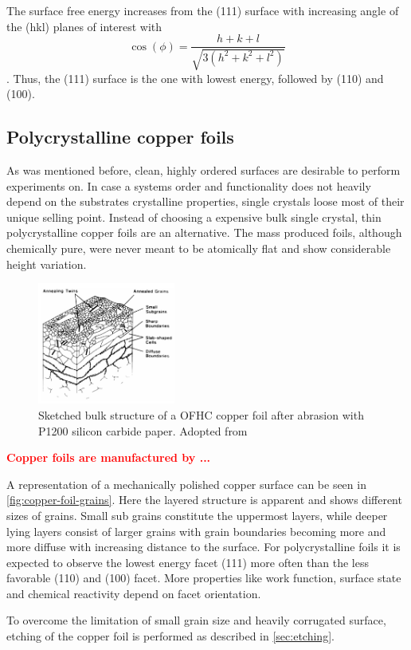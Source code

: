 The surface free energy increases from the (111) surface with increasing angle of the (hkl) planes of interest with $$\cos(\phi)=\frac{h+k+l}{\sqrt{3(h^2+k^2+l^2)}}$$ \cite{jian-min_calculation_2004}. Thus, the (111) surface is the one with lowest energy, followed by (110) and (100). 

 \subsection{Polycrystalline copper foils}
\label{sec:copper-foils}
  As was mentioned before, clean, highly ordered surfaces are desirable to perform experiments on. In case a systems order and functionality does not heavily depend on the substrates crystalline properties, single crystals loose most of their unique selling point. Instead of choosing a expensive bulk single crystal, thin polycrystalline copper foils are an alternative. The mass produced foils, although chemically pure, were never meant to be atomically flat and show considerable height variation.

\begin{figure}\centering
	\includegraphics[height=40mm]{./images/grain-structure-copper-foil}
	\caption{Sketched bulk structure of a OFHC copper foil after abrasion with P1200 silicon carbide paper. Adopted from \cite{turley_nature_1981}}
	\label{fig:copper-foil-grains}
\end{figure}

\textcolor{red}{\textbf{Copper foils are manufactured by ...}}

 A representation of a mechanically polished copper surface can be seen in \autoref{fig:copper-foil-grains}. Here the layered structure is apparent and shows different sizes of grains. Small sub grains constitute the uppermost layers, while deeper lying layers consist of larger grains with grain boundaries becoming more and more diffuse with increasing distance to the surface. For polycrystalline foils it is expected to observe the lowest energy facet (111) more often than the less favorable (110) and (100) facet. More properties like work function, surface state and chemical reactivity depend on facet orientation.
 
To overcome the limitation of small grain size and heavily corrugated surface, etching of the copper foil is performed as described in \autoref{sec:etching}.
